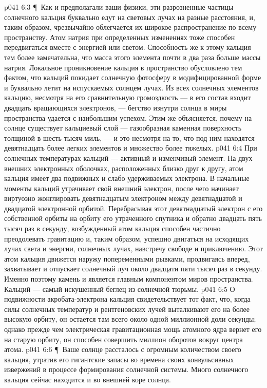 \vs p041 6:3 \P\ Как и предполагали ваши физики, эти разрозненные частицы солнечного кальция буквально едут на световых лучах на разные расстояния, и, таким образом, чрезвычайно облегчается их широкое распространение по всему пространству. Атом натрия при определенных изменениях тоже способен передвигаться вместе с энергией или светом. Способность же к этому кальция тем более замечательна, что масса этого элемента почти в два раза больше массы натрия. Локальное проникновение кальция в пространство обусловлено тем фактом, что кальций покидает солнечную фотосферу в модифицированной форме и буквально летит на испускаемых солнцем лучах. Из всех солнечных элементов кальцию, несмотря на его сравнительную громоздкость --- в его состав входит двадцать вращающихся электронов, --- бегство изнутри солнца в миры пространства удается с наибольшим успехом. Этим же объясняется, почему на солнце существует кальциевый слой --- газообразная каменная поверхность толщиной в шесть тысяч миль, --- и это несмотря на то, что под ним находятся девятнадцать более легких элементов и множество более тяжелых.
\vs p041 6:4 При солнечных температурах кальций --- активный и изменчивый элемент. На двух внешних электронных оболочках, расположенных близко друг к другу, атом кальция имеет два подвижных и слабо удерживаемых электрона. В начальные моменты кальций утрачивает свой внешний электрон, после чего начинает виртуозно жонглировать девятнадцатым электроном между девятнадцатой и двадцатой электронной орбитой. Перебрасывая этот девятнадцатый электрон с его собственной орбиты на орбиту его утраченного спутника и обратно двадцать пять тысяч раз в секунду, возбужденный атом кальция способен частично преодолевать гравитацию и, таким образом, успешно двигаться на исходящих лучах света и энергии, солнечных лучах, навстречу свободе и приключению. Этот атом кальция движется наружу попеременными рывками, продвигаясь вперед, захватывает и отпускает солнечный луч около двадцати пяти тысяч раз в секунду. Именно поэтому камень и является главным компонентом миров пространства. Кальций --- самый искушенный беглец из солнечной тюрьмы.
\vs p041 6:5 О подвижности акробата\hyp{}электрона кальция свидетельствует тот факт, что, когда силы солнечных температур и рентгеновских лучей выталкивают его на более высокую орбиту, он остается там всего около одной миллионной доли секунды; однако прежде чем электрическая гравитационная мощь атомного ядра вернет его на старую орбиту, он способен совершить миллион оборотов вокруг центра атома.
\vs p041 6:6 \P\ Ваше солнце рассталось с огромным количеством своего кальция, утратив его гигантские запасы во времена своих конвульсивных извержений в процессе формирования солнечной системы. Много солнечного кальция сейчас находится и во внешней коре солнца.
